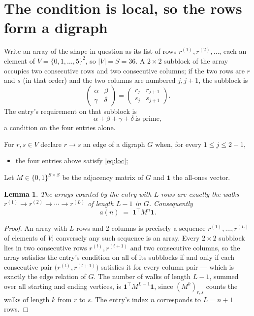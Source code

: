 \documentclass[11pt,a4paper]{article}
\theoremstyle{plain}
\newtheorem{lemma}[theorem]{Lemma}
\theoremstyle{definition}
\begin{document}
\section{The condition is local, so the rows form a digraph}

Write an array of the shape in question as its list of rows
$r^{(1)},r^{(2)},\dots$, each an element of
$V=\{0,1,\dots,5\}^{2}$, so $|V|=S=36$. A $2\times2$ subblock of the array
occupies two consecutive rows and two consecutive columns; if the two rows are $r$
and $s$ (in that order) and the two columns are numbered $j,j+1$,
the subblock is
\[
\begin{pmatrix}\alpha&\beta\\\gamma&\delta\end{pmatrix}=\begin{pmatrix}r_j&r_{j+1}\\s_j&s_{j+1}\end{pmatrix}.
\]
The entry's requirement on that subblock is
\begin{equation}\label{eq:loc}
\alpha+\beta+\gamma+\delta\ \text{is prime},
\end{equation}
a condition on the four entries alone.

For $r,s\in V$ declare $r\to s$ an edge of a digraph $G$ when, for every
$1\le j\le 2-1$,
\begin{itemize}
\item the four entries above satisfy \eqref{eq:loc};

\end{itemize}
Let $M\in\{0,1\}^{S\times S}$ be the adjacency matrix of $G$ and $\mathbf{1}$ the
all-ones vector.

\begin{lemma}\label{lem:walk}
The arrays counted by the entry with $L$ rows are exactly the walks
$r^{(1)}\to r^{(2)}\to\cdots\to r^{(L)}$ of length $L-1$ in $G$. Consequently
\[
a(n)\;=\;\mathbf{1}^{\!\top}M^{n}\mathbf{1} .
\]
\end{lemma}

\begin{proof}
An array with $L$ rows and $2$ columns is precisely a sequence
$r^{(1)},\dots,r^{(L)}$ of elements of $V$; conversely any such sequence is an array.
Every $2\times2$ subblock lies in two consecutive rows $r^{(t)},r^{(t+1)}$ and two
consecutive columns, so the array satisfies the entry's condition on all of its subblocks
if and only if each consecutive pair $\bigl(r^{(t)},r^{(t+1)}\bigr)$ satisfies it for
every column pair --- which is exactly the edge relation of $G$. The number of walks of
length $L-1$, summed over all starting and ending vertices, is
$\mathbf{1}^{\!\top}M^{L-1}\mathbf{1}$, since $(M^{k})_{r,s}$ counts the walks of
length $k$ from $r$ to $s$. The entry's index $n$ corresponds to $L=n+1$ rows.
\end{proof}
\end{document}
